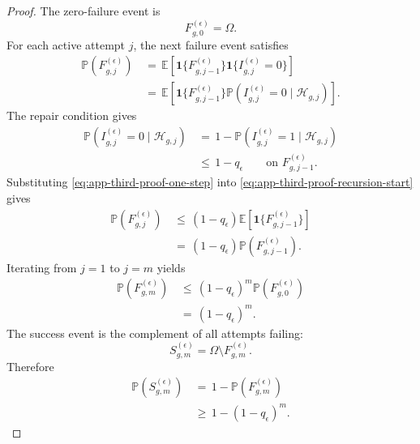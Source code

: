 \documentclass{article} %
\begin{document}
\begin{proof}
The zero-failure event is
\begin{equation}
\label{eq:app-third-proof-base-event}
F_{g,0}^{(\epsilon)}
=
\Omega.
\end{equation}
For each active attempt \(j\), the next failure event satisfies
\begin{align}
\label{eq:app-third-proof-recursion-start}
\mathbb{P}\!\left(F_{g,j}^{(\epsilon)}\right)
&\,=\,
\mathbb{E}\!\left[
\mathbf{1}\{F_{g,j-1}^{(\epsilon)}\}
\mathbf{1}\{I_{g,j}^{(\epsilon)}=0\}
\right]
\\
&\,=\,
\mathbb{E}\!\left[
\mathbf{1}\{F_{g,j-1}^{(\epsilon)}\}
\mathbb{P}\!\left(
I_{g,j}^{(\epsilon)}=0
\mid
\mathcal{H}_{g,j}
\right)
\right].
\end{align}
The repair condition gives
\begin{align}
\label{eq:app-third-proof-one-step}
\mathbb{P}\!\left(
I_{g,j}^{(\epsilon)}=0
\mid
\mathcal{H}_{g,j}
\right)
&\,=\,
1-
\mathbb{P}\!\left(
I_{g,j}^{(\epsilon)}=1
\mid
\mathcal{H}_{g,j}
\right)
\\
&\,\le\,
1-q_{\epsilon}
\qquad
\text{on }F_{g,j-1}^{(\epsilon)}.
\end{align}
Substituting \eqref{eq:app-third-proof-one-step} into \eqref{eq:app-third-proof-recursion-start} gives
\begin{align}
\label{eq:app-third-proof-recursion}
\mathbb{P}\!\left(F_{g,j}^{(\epsilon)}\right)
&\,\le\,
(1-q_{\epsilon})
\mathbb{E}\!\left[
\mathbf{1}\{F_{g,j-1}^{(\epsilon)}\}
\right]
\\
&\,=\,
(1-q_{\epsilon})
\mathbb{P}\!\left(F_{g,j-1}^{(\epsilon)}\right).
\end{align}
Iterating from \(j=1\) to \(j=m\) yields
\begin{align}
\label{eq:app-third-proof-tail}
\mathbb{P}\!\left(F_{g,m}^{(\epsilon)}\right)
&\,\le\,
(1-q_{\epsilon})^{m}
\mathbb{P}\!\left(F_{g,0}^{(\epsilon)}\right)
\\
&\,=\,
(1-q_{\epsilon})^{m}.
\end{align}
The success event is the complement of all attempts failing:
\begin{equation}
\label{eq:app-third-proof-complement}
S_{g,m}^{(\epsilon)}
=
\Omega\setminus F_{g,m}^{(\epsilon)}.
\end{equation}
Therefore
\begin{align}
\label{eq:app-third-proof-success}
\mathbb{P}\!\left(S_{g,m}^{(\epsilon)}\right)
&\,=\,
1-
\mathbb{P}\!\left(F_{g,m}^{(\epsilon)}\right)
\\
&\,\ge\,
1-(1-q_{\epsilon})^{m}.
\end{align}
\end{proof}
\end{document}
